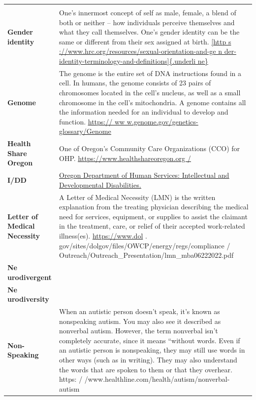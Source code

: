 \documentclass[
  letterpaper,
  DIV=11,
  numbers=noendperiod]{scrreprt}
\begin{document}
\begin{longtable}[]{@{}
  >{\raggedright\arraybackslash}p{}
  >{\raggedright\arraybackslash}p{}@{}}
{{e velandclinic.org/health/diagnostics/25034-function al-mr i-fmri}} \\
\textbf{Gender identity} & One's innermost concept of self as male,
female, a blend of both or neither -- how individuals perceive
themselves and what they call themselves. One's gender identity can be
the same or different from their sex assigned at birth.
\href{https://www.hrc.org/resources/sexual-orientati\%20o\%20n-and-gender-identity-terminology-and-definitions}{{[}http
s ://www.hrc.org/resources/sexual-orientation-and-ge n
der-identity-terminology-and-definitions{]}\{.underli ne\}} \\
\textbf{Genome} & The genome is the entire set of DNA instructions found
in a cell. In humans, the genome consists of 23 pairs of chromosomes
located in the cell's nucleus, as well as a small chromosome in the
cell's mitochondria. A genome contains all the information needed for an
individual to develop and function.
\href{https://www.genome.gov/genetics-glossary/Genome}{\uline{https://
ww w.genome.gov/genetics-glossary/Genome}} \\
\textbf{Health Share Oregon} & One of Oregon's Community Care
Organizations (CCO) for OHP.
\href{https://www.healthshareoregon.org/}{\uline{https://www.healthshareoregon.org
/}} \\
\textbf{I/DD} &
\href{h\%20ttps://www.oregon.gov/odhs/idd/pages/default.aspx}{\uline{Oregon
Department of Human Services: Intellectual and Developmental
Disabilities.}} \\
\textbf{Letter of Medical Necessity} & A Letter of Medical Necessity
(LMN) is the written explanation from the treating physician describing
the medical need for services, equipment, or supplies to assist the
claimant in the treatment, care, or relief of their accepted
work-related illness(es). \url{https://www.dol} .
gov/sites/dolgov/files/OWCP/energy/regs/compliance /
Outreach/Outreach\_Presentation/lmn\_mba06222022.pdf \\
\textbf{Ne urodivergent} & \\
\textbf{Ne urodiversity} & \\
\textbf{Non-Speaking} & When an autistic person doesn't speak, it's
known as nonspeaking autism. You may also see it described as nonverbal
autism. However, the term nonverbal isn't completely accurate, since it
means ``without words. Even if an autistic person is nonspeaking, they
may still use words in other ways (such as in writing). They may also
understand the words that are spoken to them or that they overhear.
https: / /www.healthline.com/health/autism/nonverbal-autism \\

\end{longtable}
\end{document}
